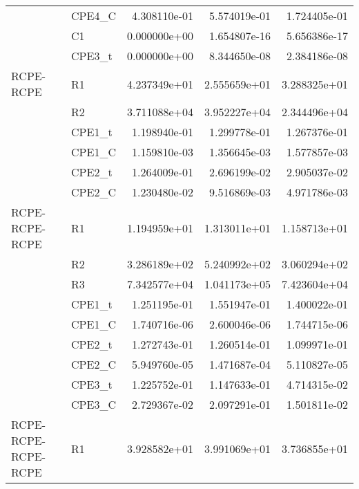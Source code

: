 \begin{tabular}{llrrr}
                    &    CPE4\_C & 4.308110e-01 &     5.574019e-01 &              1.724405e-01 \\
                    &        C1 & 0.000000e+00 &     1.654807e-16 &              5.656386e-17 \\
                    &    CPE3\_t & 0.000000e+00 &     8.344650e-08 &              2.384186e-08 \\
          RCPE-RCPE &        R1 & 4.237349e+01 &     2.555659e+01 &              3.288325e+01 \\
                    &        R2 & 3.711088e+04 &     3.952227e+04 &              2.344496e+04 \\
                    &    CPE1\_t & 1.198940e-01 &     1.299778e-01 &              1.267376e-01 \\
                    &    CPE1\_C & 1.159810e-03 &     1.356645e-03 &              1.577857e-03 \\
                    &    CPE2\_t & 1.264009e-01 &     2.696199e-02 &              2.905037e-02 \\
                    &    CPE2\_C & 1.230480e-02 &     9.516869e-03 &              4.971786e-03 \\
     RCPE-RCPE-RCPE &        R1 & 1.194959e+01 &     1.313011e+01 &              1.158713e+01 \\
                    &        R2 & 3.286189e+02 &     5.240992e+02 &              3.060294e+02 \\
                    &        R3 & 7.342577e+04 &     1.041173e+05 &              7.423604e+04 \\
                    &    CPE1\_t & 1.251195e-01 &     1.551947e-01 &              1.400022e-01 \\
                    &    CPE1\_C & 1.740716e-06 &     2.600046e-06 &              1.744715e-06 \\
                    &    CPE2\_t & 1.272743e-01 &     1.260514e-01 &              1.099971e-01 \\
                    &    CPE2\_C & 5.949760e-05 &     1.471687e-04 &              5.110827e-05 \\
                    &    CPE3\_t & 1.225752e-01 &     1.147633e-01 &              4.714315e-02 \\
                    &    CPE3\_C & 2.729367e-02 &     2.097291e-01 &              1.501811e-02 \\
RCPE-RCPE-RCPE-RCPE &        R1 & 3.928582e+01 &     3.991069e+01 &              3.736855e+01 \\

\end{tabular}
